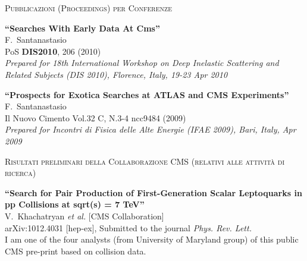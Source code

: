\documentclass[10pt, a4paper]{article}
\begin{document}
\begin{thebibliography}{599}
\vspace{0.1cm} \begin{center} \textsc{Pubblicazioni (Proceedings) per Conferenze} \end{center} \vspace{0.05cm}

{\bf ``Searches With Early Data At Cms''}
  \\{}F.~Santanastasio
  \\{}PoS {\bf DIS2010}, 206 (2010)
\\{}{\it Prepared for 18th International Workshop on Deep Inelastic Scattering and Related Subjects (DIS 2010), Florence, Italy, 19-23 Apr 2010}

{\bf ``Prospects for Exotica Searches at ATLAS and CMS Experiments''}
  \\{}F.~Santanastasio
  \\{}Il Nuovo Cimento Vol.32 C, N.3-4 ncc9484 (2009)
\\{}{\it Prepared for Incontri di Fisica delle Alte Energie (IFAE 2009), Bari, Italy, Apr 2009}

\vspace{0.1cm} \begin{center} \textsc{Risultati preliminari della Collaborazione CMS (relativi alle attivit\`a di ricerca)} \end{center} \vspace{0.05cm}

{\bf ``Search for Pair Production of First-Generation Scalar Leptoquarks in pp Collisions at sqrt(s) = 7 TeV''}
  \\{}V.~Khachatryan {\it et al.}  [CMS Collaboration]
  \\{}arXiv:1012.4031 [hep-ex], Submitted to the journal {\it Phys. Rev. Lett.}
  \\I am one of the four analysts (from University of Maryland group) of this public CMS pre-print based on collision data.


\end{thebibliography}
\end{document}
